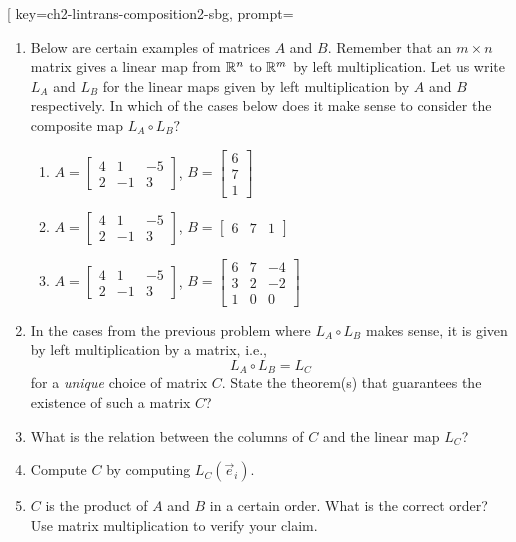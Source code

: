 \begin{SaveQuestion}[
        key=ch2-lintrans-composition2-sbg,
        prompt={\begin{enumerate} 
        \item Below are certain examples of matrices $A$ and $B$. Remember that an $m\times n$ matrix gives a linear map from $\mathbb{R}^n$ to $\mathbb{R}^m$ by left multiplication. Let us write $L_A$ and $L_B$ for the linear maps given by left multiplication by $A$ and $B$ respectively. In which of the cases below does it make sense to consider the composite map \( L_A \circ L_B ? \) \begin{enumerate} \item  $A= \begin{bmatrix} 4 & 1 & -5 \\ 2 & -1 & 3\end{bmatrix}$, $B= \begin{bmatrix} 6 \\ 7\\1  \end{bmatrix} $ \item $A= \begin{bmatrix} 4 & 1 & -5\\ 2 & -1 & 3 \end{bmatrix}$, $B= \begin{bmatrix} 6 & 7&1  \end{bmatrix} $ \item $A= \begin{bmatrix} 4 & 1 & -5 \\ 2 & -1 & 3\end{bmatrix}$, $B= \begin{bmatrix} 6 & 7 & -4 \\ 3 & 2 &  -2\\1&0&0\end{bmatrix} $ \end{enumerate}\item In the cases from the previous problem where $L_A \circ L_B$ makes sense, it is given by left multiplication by a matrix, i.e., \[ L_A \circ L_B = L_C \] for a {\it unique} choice of matrix $C$. State the theorem(s) that guarantees the existence of such a matrix $C$? 
        \item  What is the relation between the columns of $C$ and the linear map $L_C$? 
        \item Compute $C$ by computing $L_C(\vec{e}_i)$. 
        \item $C$ is the product of $A$ and $B$ in a certain order. What is the correct order? Use matrix multiplication to verify your claim. 

\end{enumerate}}
\end{SaveQuestion}
